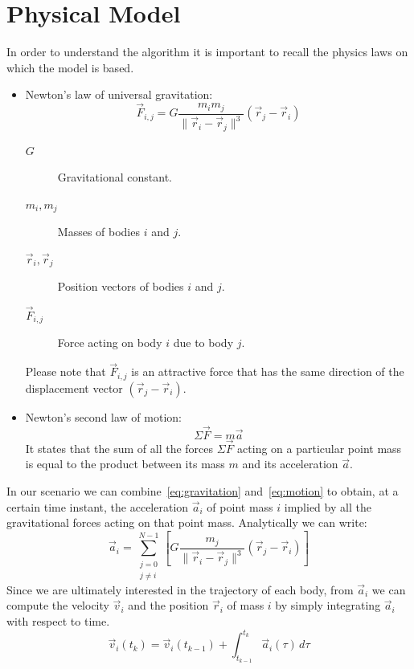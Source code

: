 \documentclass{article}
\begin{document}
\section{Physical Model}
In order to understand the algorithm it is important to recall the physics laws on which the model is based.
\begin{itemize}
\item Newton's law of universal gravitation:
\begin{equation}
\vec{F}_{i,j}=G\frac{m_{i} m_{j}}{\|\vec{r}_{i}-\vec{r}_{j}\|^3}(\vec{r}_{j}-\vec{r}_{i})
\label{eq:gravitation}
\end{equation}
\begin{description}
    \item[\( G \)] Gravitational constant.
    \item[\( m_i, m_j \)] Masses of bodies \( i \) and \( j \).
    \item[\( \vec{r}_i, \vec{r}_j \)] Position vectors of bodies \( i \) and \( j \).
    \item[\( \vec{F}_{i,j} \)] Force acting on body \( i \) due to body \( j \).
\end{description}
Please note that $\vec{F}_{i,j}$ is an attractive force that has the same direction of the displacement vector \mbox{$(\vec{r}_j - \vec{r}_i)$}.
\item Newton's second law of motion:
\begin{equation}
\Sigma\vec{F} = m\vec{a}
\label{eq:motion}
\end{equation}
It states that the sum of all the forces $\Sigma\vec{F}$ acting on a particular point mass is equal to the product between its mass $m$ and its acceleration $\vec{a}$.
\end{itemize}
In our scenario we can combine~\eqref{eq:gravitation} and~\eqref{eq:motion} to obtain, at a certain time instant, the acceleration $\vec{a}_i$ of point mass $i$ implied by all the gravitational forces acting on that point mass. Analytically we can write:
\begin{equation}
\vec{a}_i=\sum_{\substack{j=0 \\ j \neq i}}^{N-1}\left[G\frac{m_j}{\|\vec{r}_i-\vec{r}_j\|^3}(\vec{r}_j-\vec{r}_i)\right]
\label{eq:acceleration}
\end{equation}
Since we are ultimately interested in the trajectory of each body, from $\vec{a}_i$ we can compute the velocity $\vec{v}_i$ and the position $\vec{r}_i$ of mass $i$ by simply integrating $\vec{a}_i$ with respect to time.
\begin{equation}
\vec{v}_i(t_k) = \vec{v}_i(t_{k-1}) + \int_{t_{k-1}}^{t_k} \vec{a}_i(\tau)\, d\tau
\label{eq:continuous_v}
\end{equation}
\end{document}
